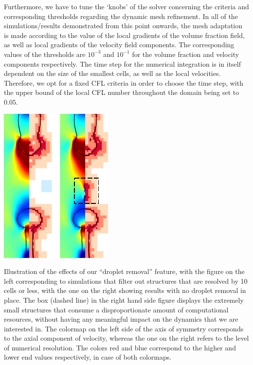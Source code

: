 Furthermore, we have to tune the `knobs' of the 
solver concerning the criteria and corresponding 
thresholds regarding the dynamic mesh refinement. 
In all of the simulations/results demonstrated 
from this point onwards, the mesh adaptation is 
made according to the value of the local 
gradients of the volume fraction field, 
as well as local gradients of the velocity field components.  
The corresponding values of the thresholds are $10^{-3}$ 
and $10^{-1}$ for the volume fraction and velocity components respectively. 
The time step for the numerical integration is in itself dependent on the 
size of the smallest cells, as well as the local velocities. 
Therefore, we opt for a fixed CFL criteria in order to choose the time step, 
with the upper bound of the local CFL number throughout the domain being set to $0.05$.

\begin{marginfigure}[-6cm]
\centering
\includegraphics{plots/ligament_breakup/drop_removal.pdf}
	\caption{Illustration of the effects of our ``droplet removal'' feature, 
	with the figure on the left corresponding to simulations that filter out
	structures that are resolved by 10 cells or less, with the one on the right
	showing results with no droplet removal in place. The box (dashed line) in the 
	right hand side figure displays the extremely small structures that consume 
	a disproportionate amount of computational resources, without having any meaningful
	impact on the dynamics that we are interested in. 
	The colormap on the left side of the axis of 
	symmetry corresponds to the axial component of velocity, whereas the one on the right refers
	to the level of numerical resolution. The colors red and blue correspond to the higher 
	and lower end values respectively, in case of both colormaps. 
	}
\label{drop_remove}
\end{marginfigure}

